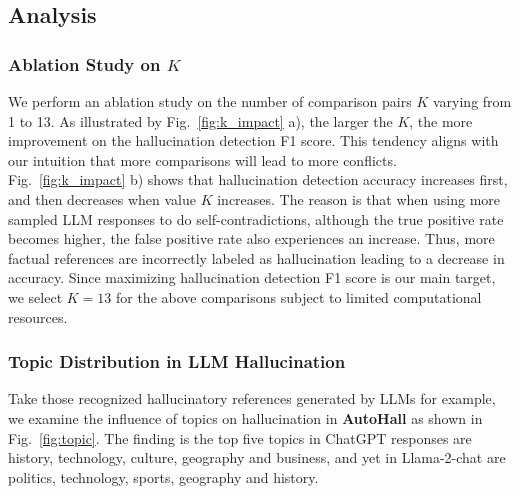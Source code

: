 


\subsection{Analysis}
\subsubsection{Ablation Study on $K$}
We perform an ablation study on the number of comparison pairs $K$ varying from 1 to 13. As illustrated by Fig.~\ref{fig:k_impact} a), the larger the $K$, the more improvement on the hallucination detection F1 score. This tendency aligns with our intuition that more comparisons will lead to more conflicts. Fig.~\ref{fig:k_impact} b) shows that hallucination detection accuracy increases first, and then decreases when value $K$ increases. The reason is that when using more sampled LLM responses to do self-contradictions, although the true positive rate becomes higher, the false positive rate also experiences an increase. 
Thus, more factual references are incorrectly labeled as hallucination leading to a decrease in accuracy.
Since maximizing hallucination detection F1 score is our main target, we select $K = 13$ for the above comparisons subject to limited computational resources.



\subsubsection{Topic Distribution in LLM Hallucination}
Take those recognized hallucinatory references generated by LLMs for example, we examine the influence of topics on hallucination in \textbf{AutoHall} as shown in Fig.~\ref{fig:topic}. The finding is the top five topics in ChatGPT responses are history, technology, culture, geography and business, and yet in Llama-2-chat are politics, technology, sports, geography and history.


